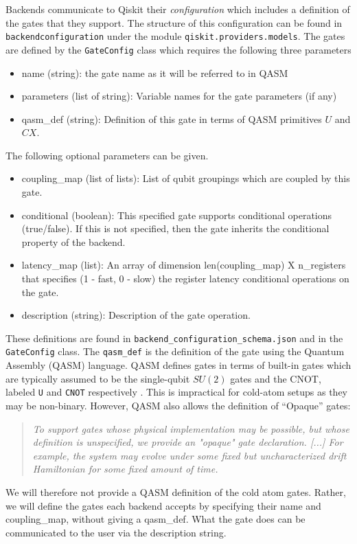 \documentclass[a4paper, 10pt]{article}
\begin{document}
Backends communicate to Qiskit their \emph{configuration} which includes a definition of the gates that they support.
The structure of this configuration can be found in \texttt{backendconfiguration} under the module \texttt{qiskit.providers.models}.
The gates are defined by the \texttt{GateConfig} class which requires the following three parameters
\begin{itemize}
    \item name (string): the gate name as it will be referred to in QASM
    \item parameters (list of string): Variable names for the gate parameters (if any)
    \item qasm\_def (string): Definition of this gate in terms of QASM primitives $U$ and $CX$.
\end{itemize}
The following optional parameters can be given.
\begin{itemize}
    \item coupling\_map (list of lists): List of qubit groupings which are coupled by this gate.
    \item conditional (boolean): This specified gate supports conditional operations (true/false). If this is not specified, then the gate inherits the conditional property of the backend.
    \item latency\_map (list): An array of dimension len(coupling\_map) X n\_registers that specifies (1 - fast, 0 - slow) the register latency conditional operations on the gate.
    \item description (string): Description of the gate operation.
\end{itemize}
These definitions are found in \texttt{backend{\_}configuration{\_}schema.json} and in the \texttt{GateConfig} class.
The \texttt{qasm\_def} is the definition of the gate using the Quantum Assembly (QASM) language.
QASM defines gates in terms of built-in gates which are typically assumed to be the single-qubit $SU(2)$ gates and the CNOT, labeled \texttt{U} and \texttt{CNOT} respectively \cite{Cross2017}.
This is impractical for cold-atom setups as they may be non-binary.
However, QASM also allows the definition of ``Opaque'' gates:
    \begin{quote} \em
        To support gates whose physical implementation may be possible, but whose definition is unspecified, we provide an "opaque" gate declaration. [...] For example, the system may evolve under some fixed but uncharacterized drift Hamiltonian for some fixed amount of time.
    \end{quote}
We will therefore not provide a QASM definition of the cold atom gates. Rather, we will define the gates each backend accepts by specifying their name and coupling{\_}map, without giving a qasm{\_}def. What the gate does can be communicated to the user via the description string. 
    
\end{document}
